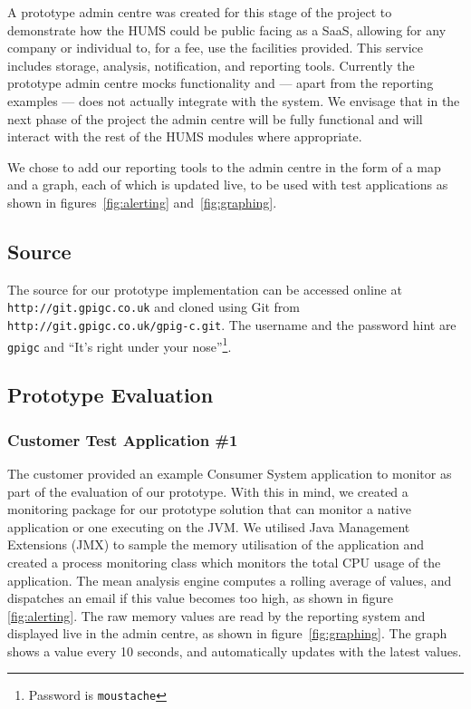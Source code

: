 \documentclass[10pt,a4paper]{article}
\begin{document}
A prototype admin centre was created for this stage of the project to 
demonstrate how the HUMS could be public facing as a SaaS, allowing for any 
company or individual to, for a fee, use the facilities provided. This service includes
storage, analysis, notification, and reporting tools. Currently the prototype 
admin centre mocks functionality and --- apart from the reporting examples --- 
does not actually integrate with the system. We envisage that in the next phase 
of the project the admin centre will be fully functional and will interact with the rest of the HUMS modules where appropriate.

We chose to add our reporting tools to the admin centre in the form of a map
and a graph, each of which is updated live, to be used with test applications as shown in figures~\ref{fig:alerting} and~\ref{fig:graphing}.

\subsection{Source}
\label{sec:source}
The source for our prototype implementation can be accessed online at \texttt{http://git.gpigc.co.uk} and cloned using Git from \texttt{http://git.gpigc.co.uk/gpig-c.git}. The username and the password hint are \texttt{gpigc} and ``It's right under your nose''\footnote{Password is \texttt{moustache}}.

\subsection{Prototype Evaluation}
\label{sec:prototype-evaluation}

\subsubsection{Customer Test Application \#1}
\label{sec:testapp}
The customer provided an example Consumer System application to monitor as part of the
evaluation of our prototype. With this in mind, we created a monitoring 
package for our prototype solution that can monitor a native application
or one executing on the JVM. We utilised Java Management 
Extensions (JMX) to sample the memory utilisation of the application and
created a process monitoring class which monitors the total
CPU usage of the application. The mean analysis engine computes a 
rolling average of values, and dispatches an email if this value
becomes too high, as shown in figure \ref{fig:alerting}. The raw memory
values are read by the reporting system and displayed live in the admin
centre, as shown in figure~\ref{fig:graphing}. The graph shows a value
every 10 seconds, and automatically updates with the latest values.
\end{document}
